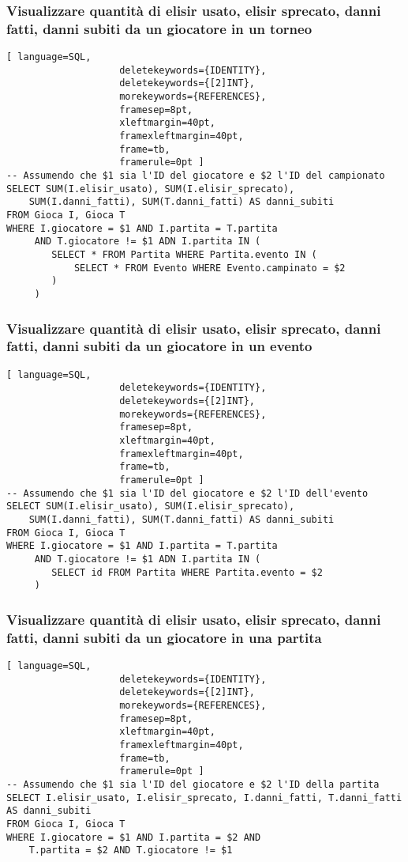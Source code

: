 \documentclass{article}
\begin{document}
\subsubsection{Visualizzare quantità di elisir usato, elisir sprecato, danni fatti, danni subiti da un giocatore in un torneo}
\begin{lstlisting}[ language=SQL,
                    deletekeywords={IDENTITY},
                    deletekeywords={[2]INT},
                    morekeywords={REFERENCES},
                    framesep=8pt,
                    xleftmargin=40pt,
                    framexleftmargin=40pt,
                    frame=tb,
                    framerule=0pt ]
-- Assumendo che $1 sia l'ID del giocatore e $2 l'ID del campionato
SELECT SUM(I.elisir_usato), SUM(I.elisir_sprecato), 
    SUM(I.danni_fatti), SUM(T.danni_fatti) AS danni_subiti
FROM Gioca I, Gioca T
WHERE I.giocatore = $1 AND I.partita = T.partita
     AND T.giocatore != $1 ADN I.partita IN (
        SELECT * FROM Partita WHERE Partita.evento IN (
            SELECT * FROM Evento WHERE Evento.campinato = $2
        )
     )
\end{lstlisting}

\subsubsection{Visualizzare quantità di elisir usato, elisir sprecato, danni fatti, danni subiti da un giocatore in un evento}
\begin{lstlisting}[ language=SQL,
                    deletekeywords={IDENTITY},
                    deletekeywords={[2]INT},
                    morekeywords={REFERENCES},
                    framesep=8pt,
                    xleftmargin=40pt,
                    framexleftmargin=40pt,
                    frame=tb,
                    framerule=0pt ]
-- Assumendo che $1 sia l'ID del giocatore e $2 l'ID dell'evento
SELECT SUM(I.elisir_usato), SUM(I.elisir_sprecato), 
    SUM(I.danni_fatti), SUM(T.danni_fatti) AS danni_subiti
FROM Gioca I, Gioca T
WHERE I.giocatore = $1 AND I.partita = T.partita
     AND T.giocatore != $1 ADN I.partita IN (
        SELECT id FROM Partita WHERE Partita.evento = $2
     )
\end{lstlisting}

\subsubsection{Visualizzare quantità di elisir usato, elisir sprecato, danni fatti, danni subiti da un giocatore in una partita}
\begin{lstlisting}[ language=SQL,
                    deletekeywords={IDENTITY},
                    deletekeywords={[2]INT},
                    morekeywords={REFERENCES},
                    framesep=8pt,
                    xleftmargin=40pt,
                    framexleftmargin=40pt,
                    frame=tb,
                    framerule=0pt ]
-- Assumendo che $1 sia l'ID del giocatore e $2 l'ID della partita
SELECT I.elisir_usato, I.elisir_sprecato, I.danni_fatti, T.danni_fatti AS danni_subiti
FROM Gioca I, Gioca T
WHERE I.giocatore = $1 AND I.partita = $2 AND
    T.partita = $2 AND T.giocatore != $1
\end{lstlisting}
\end{document}

